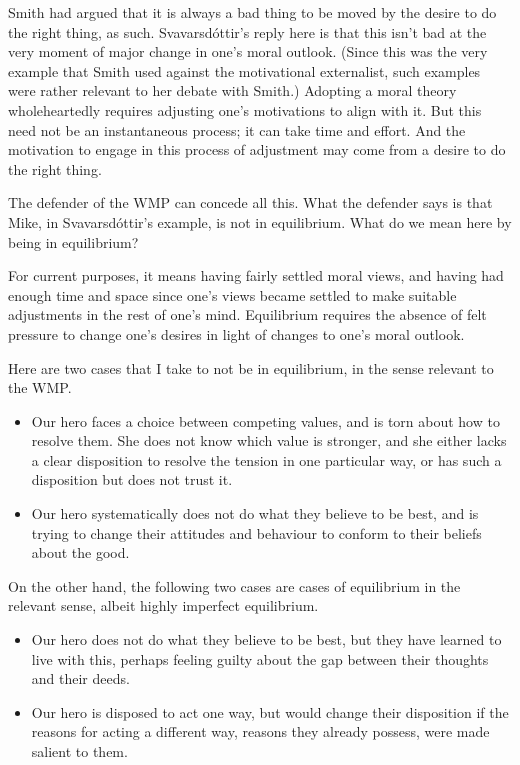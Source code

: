 \documentclass[
  10pt,
  letterpaper,
  twoside]{scrbook}
\providecommand{\tightlist}{%
  \setlength{\itemsep}{0pt}\setlength{\parskip}{0pt}}\usepackage{longtable,booktabs,array}
\begin{document}
Smith had argued that it is always a bad thing to be moved by the desire
to do the right thing, as such. Svavarsdóttir's reply here is that this
isn't bad at the very moment of major change in one's moral outlook.
(Since this was the very example that Smith used against the
motivational externalist, such examples were rather relevant to her
debate with Smith.) Adopting a moral theory wholeheartedly requires
adjusting one's motivations to align with it. But this need not be an
instantaneous process; it can take time and effort. And the motivation
to engage in this process of adjustment may come from a desire to do the
right thing.

The defender of the WMP can concede all this. What the defender says is
that {Mike}, in Svavarsdóttir's example, is not in equilibrium. What do
we mean here by being in equilibrium?

For current purposes, it means having fairly settled moral views, and
having had enough time and space since one's views became settled to
make suitable adjustments in the rest of one's mind. Equilibrium
requires the absence of felt pressure to change one's desires in light
of changes to one's moral outlook.

Here are two cases that I take to not be in equilibrium, in the sense
relevant to the WMP.

\begin{itemize}
\tightlist
\item
  Our hero faces a choice between competing values, and is torn about
  how to resolve them. She does not know which value is stronger, and
  she either lacks a clear disposition to resolve the tension in one
  particular way, or has such a disposition but does not trust it.
\item
  Our hero systematically does not do what they believe to be best, and
  is trying to change their attitudes and behaviour to conform to their
  beliefs about the good.
\end{itemize}

On the other hand, the following two cases are cases of equilibrium in
the relevant sense, albeit highly imperfect equilibrium.

\begin{itemize}
\tightlist
\item
  Our hero does not do what they believe to be best, but they have
  learned to live with this, perhaps feeling guilty about the gap
  between their thoughts and their deeds.
\item
  Our hero is disposed to act one way, but would change their
  disposition if the reasons for acting a different way, reasons they
  already possess, were made salient to them.
\end{itemize}
\end{document}
